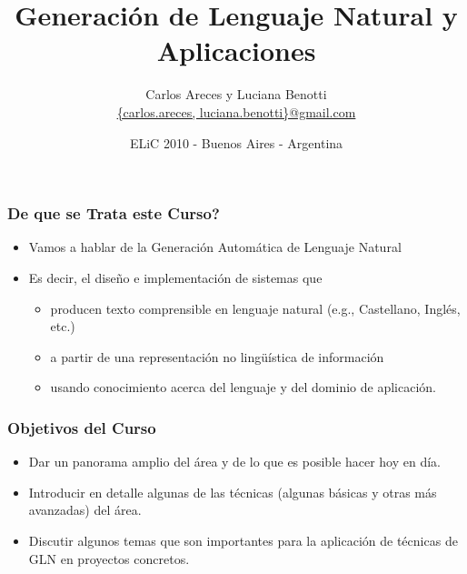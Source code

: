 \documentclass[compress,color=usenames]{beamer}
\title[GLN y Aplicaciones]{\Huge Generaci\'on de Lenguaje Natural y Aplicaciones}
\author[Areces \& Benotti]{
 Carlos Areces y Luciana Benotti\\[1ex]
\normalsize \url{{carlos.areces, luciana.benotti}@gmail.com}}
\institute[INRIA / UNC]{
INRIA Nancy Grand Est, Nancy, France\\
Universidad Nacional de C\'ordoba, C\'ordoba, Argentina}
\date{ELiC 2010 - Buenos Aires - Argentina}
\begin{document}
\beamerdefaultoverlayspecification{}


\begin{frame}[plain]
 \titlepage
\end{frame}

\begin{frame}
\frametitle{De que se Trata este Curso?}

\begin{itemize}
\item Vamos a hablar de la Generaci\'on Autom\'atica de Lenguaje Natural
\item Es decir, el dise\~no e implementaci\'on de sistemas que 
\begin{itemize}
\item producen texto comprensible en lenguaje natural (e.g., Castellano, 
Ingl\'es, etc.)
\item a partir de una representaci\'on no ling\"u\'istica de informaci\'on
\item usando conocimiento acerca del lenguaje y del dominio de aplicaci\'on.
\end{itemize}

\end{itemize}


\end{frame}

\begin{frame}
\frametitle{Objetivos del Curso}

\begin{itemize}
\item Dar un panorama amplio del \'area y de lo que es posible hacer hoy en d\'ia.
\item Introducir en detalle algunas de las t\'ecnicas (algunas b\'asicas y otras 
m\'as avanzadas) del \'area. 
\item Discutir algunos temas que son importantes para la aplicaci\'on de 
t\'ecnicas de GLN en proyectos concretos.
\end{itemize}
\end{frame}
\end{document}
